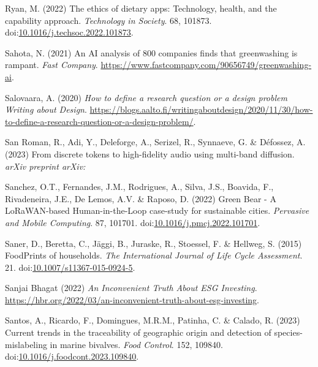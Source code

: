 \documentclass[
  letterpaper,
  DIV=11,
  numbers=noendperiod]{scrartcl}
\newlength{\cslhangindent}
\newenvironment{CSLReferences}[2] %
 {\begin{list}{}{%
  \setlength{\itemindent}{0pt}
  \setlength{\leftmargin}{0pt}
  \setlength{\parsep}{0pt}
  \ifodd #1
   \setlength{\leftmargin}{\cslhangindent}
   \setlength{\itemindent}{-1\cslhangindent}
  \fi
  \setlength{\itemsep}{#2\baselineskip}}}
 {\end{list}}
\begin{document}
\begin{CSLReferences}{0}{1}
Ryan, M. (2022) The ethics of dietary apps: {Technology}, health, and
the capability approach. \emph{Technology in Society}. 68, 101873.
doi:\href{https://doi.org/10.1016/j.techsoc.2022.101873}{10.1016/j.techsoc.2022.101873}.

Sahota, N. (2021) An {AI} analysis of 800 companies finds that
greenwashing is rampant. \emph{Fast Company}.
\url{https://www.fastcompany.com/90656749/greenwashing-ai}.

Salovaara, A. (2020) \emph{How to define a research question or a design
problem {\textbar} {Writing} about {Design}}.
\url{https://blogs.aalto.fi/writingaboutdesign/2020/11/30/how-to-define-a-research-question-or-a-design-problem/}.

San Roman, R., Adi, Y., Deleforge, A., Serizel, R., Synnaeve, G. \&
Défossez, A. (2023) From discrete tokens to high-fidelity audio using
multi-band diffusion. \emph{arXiv preprint arXiv:}

Sanchez, O.T., Fernandes, J.M., Rodrigues, A., Silva, J.S., Boavida, F.,
Rivadeneira, J.E., De Lemos, A.V. \& Raposo, D. (2022) Green {Bear} - {A
LoRaWAN-based Human-in-the-Loop} case-study for sustainable cities.
\emph{Pervasive and Mobile Computing}. 87, 101701.
doi:\href{https://doi.org/10.1016/j.pmcj.2022.101701}{10.1016/j.pmcj.2022.101701}.

Saner, D., Beretta, C., Jäggi, B., Juraske, R., Stoessel, F. \& Hellweg,
S. (2015) {FoodPrints} of households. \emph{The International Journal of
Life Cycle Assessment}. 21.
doi:\href{https://doi.org/10.1007/s11367-015-0924-5}{10.1007/s11367-015-0924-5}.

Sanjai Bhagat (2022) \emph{An {Inconvenient Truth About ESG Investing}}.
\url{https://hbr.org/2022/03/an-inconvenient-truth-about-esg-investing}.

Santos, A., Ricardo, F., Domingues, M.R.M., Patinha, C. \& Calado, R.
(2023) Current trends in the traceability of geographic origin and
detection of species-mislabeling in marine bivalves. \emph{Food
Control}. 152, 109840.
doi:\href{https://doi.org/10.1016/j.foodcont.2023.109840}{10.1016/j.foodcont.2023.109840}.


\end{CSLReferences}
\end{document}
